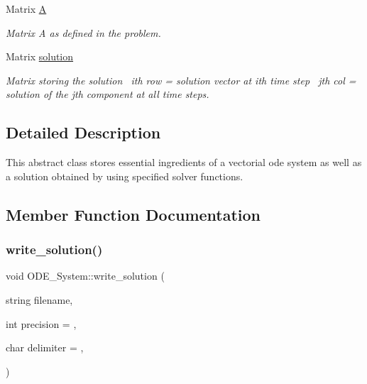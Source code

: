 \begin{DoxyCompactItemize}
Matrix \mbox{\hyperlink{class_o_d_e___system_a632009677e80b62a1996e842398bf8b6}{A}}
\begin{DoxyCompactList}\small\item\em Matrix A as defined in the problem. \end{DoxyCompactList}\item 
\mbox{\label{class_o_d_e___system_ab2504680346a353e353f147f1ad9c51d}} 
Matrix \mbox{\hyperlink{class_o_d_e___system_ab2504680346a353e353f147f1ad9c51d}{solution}}
\begin{DoxyCompactList}\small\item\em Matrix storing the solution~\newline
ith row = solution vector at ith time step~\newline
jth col = solution of the jth component at all time steps. \end{DoxyCompactList}\end{DoxyCompactItemize}


\subsection{Detailed Description}
This abstract class stores essential ingredients of a vectorial ode system as well as a solution obtained by using specified solver functions. 

\subsection{Member Function Documentation}
\mbox{\label{class_o_d_e___system_a89537c37978b13e3540976bcb7fc603f}} 
\subsubsection{\texorpdfstring{write\+\_\+solution()}{write\_solution()}}
{\footnotesize\ttfamily void O\+D\+E\+\_\+\+System\+::write\+\_\+solution (\begin{DoxyParamCaption}\item[{string}]{filename,  }\item[{int}]{precision = {},  }\item[{char}]{delimiter = {\ttfamily \textquotesingle{},\textquotesingle{}} }\end{DoxyParamCaption})}



